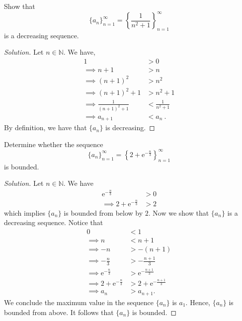 \documentclass[compacto,10pt,comentarios]{aleph-notas}
\begin{document}
\begin{ejer}
    Show that 
    $$
        \{a_n\}_{n=1}^{\infty} = \left\{ \frac{1}{n^{2} + 1} \right\}_{n=1}^{\infty}
    $$
    is a decreasing sequence.
\end{ejer}
\begin{proof}[Solution]
    Let $n \in \mathbb{N}$. We have,
    \begin{align*}
        1 & > 0 \\
        \implies n + 1 & > n \\
        \implies (n+1)^2 & > n^2 \\
        \implies (n+1)^2 + 1 & > n^2 + 1 \\
        \implies \frac{1}{(n+1)^{2} + 1} & < \frac{1}{n^2 + 1} \\
        \implies a_{n+1} & < a_{n} ~.
    \end{align*}
    By definition, we have that $\{a_n\}$ is decreasing.
\end{proof}

\begin{ejer}
    Determine whether the sequence
    $$
        \{a_{n}\}_{n=1}^{\infty} = \left\{ 2 + \mathrm{e}^{-\frac{n}{3}} \right\}_{n=1}^{\infty}
    $$
    is bounded.
\end{ejer}
\begin{proof}[Solution]
    Let $n \in \mathbb{N}$. We have
    \begin{align*}
        \mathrm{e}^{-\frac{n}{3}} & > 0 \\
        \implies 2 + \mathrm{e}^{-\frac{n}{3}} & > 2
    \end{align*}
    which implies $\{a_n\}$ is bounded from below by $2$. Now we show that $\{a_n\}$ is a decreasing sequence. Notice that
    \begin{align*}
        0 & <  1 \\
        \implies n & < n + 1 \\
        \implies -n & > - (n + 1) \\
        \implies -\frac{n}{3} & > - \frac{n + 1}{3} \\
        \implies \mathrm{e}^{-\frac{n}{3}} & > \mathrm{e}^{- \frac{n + 1}{3}} \\
        \implies 2 + \mathrm{e}^{-\frac{n}{3}} & >  2 + \mathrm{e}^{- \frac{n + 1}{3}} \\
        \implies a_n & >  a_{n+1}.
    \end{align*}
    We conclude the maximum value in the sequence $\{a_n\}$ is $a_1$. Hence, $\{a_n\}$ is bounded from above. It follows that $\{a_n\}$ is bounded.
\end{proof}
\end{document}
